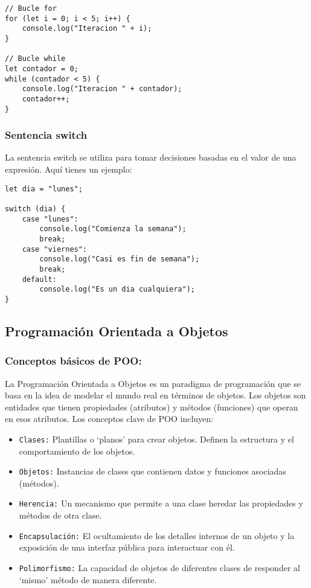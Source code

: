 \documentclass[executivepaper]{article}
\begin{document}
\begin{lstlisting}
// Bucle for
for (let i = 0; i < 5; i++) {
    console.log("Iteracion " + i);
}

// Bucle while
let contador = 0;
while (contador < 5) {
    console.log("Iteracion " + contador);
    contador++;
}
\end{lstlisting}

\subsubsection*{Sentencia switch}
La sentencia switch se utiliza para tomar decisiones basadas en el valor de una expresión. Aquí tienes un ejemplo:

\begin{lstlisting}
let dia = "lunes";

switch (dia) {
    case "lunes":
        console.log("Comienza la semana");
        break;
    case "viernes":
        console.log("Casi es fin de semana");
        break;
    default:
        console.log("Es un dia cualquiera");
}  
\end{lstlisting}

\subsection{Programación Orientada a Objetos}
\subsubsection*{Conceptos básicos de POO:}
La Programación Orientada a Objetos es un paradigma de programación que se basa en la idea de modelar el mundo real en términos de objetos. Los objetos son entidades que tienen propiedades (atributos) y métodos (funciones) que operan en esos atributos. Los conceptos clave de POO incluyen:

\begin{itemize}
  \item \texttt{Clases:} Plantillas o \enquote*{planos} para crear objetos. Definen la estructura y el comportamiento de los objetos.
  \item \texttt{Objetos:} Instancias de clases que contienen datos y funciones asociadas (métodos).
  \item \texttt{Herencia:} Un mecanismo que permite a una clase heredar las propiedades y métodos de otra clase.
  \item \texttt{Encapsulación:} El ocultamiento de los detalles internos de un objeto y la exposición de una interfaz pública para interactuar con él.
  \item \texttt{Polimorfismo:} La capacidad de objetos de diferentes clases de responder al \enquote*{mismo} método de manera diferente.
\end{itemize}
\end{document}
